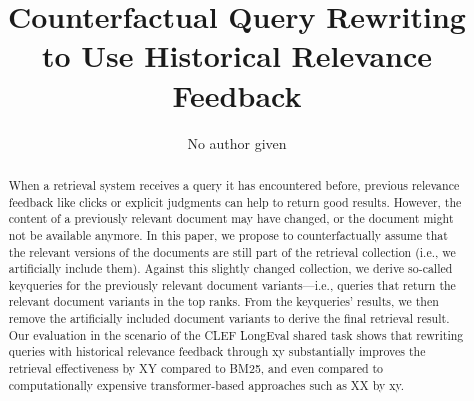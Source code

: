 \title{Counterfactual Query Rewriting \\ to Use Historical Relevance Feedback}

\author{No author given}



\maketitle

\begin{abstract}
When a retrieval system receives a query it has encountered before, previous relevance feedback like clicks or explicit judgments can help to return good results. However, the content of a previously relevant document may have changed, or the document might not be available anymore. In this paper, we propose to counterfactually assume that the relevant versions of the documents are still part of the retrieval collection (i.e., we artificially include them). Against this slightly changed collection, we derive so-called keyqueries for the previously relevant document variants---i.e., queries that return the relevant document variants in the top ranks. From the keyqueries' results, we then remove the artificially included document variants to derive the final retrieval result. Our evaluation in the scenario of the CLEF LongEval shared task shows that rewriting queries with historical relevance feedback through {\color{red} xy substantially improves the retrieval effectiveness by XY compared to BM25, and even compared to computationally expensive transformer-based approaches such as XX by xy.}

\end{abstract}
